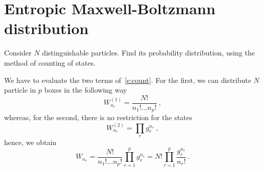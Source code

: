\section{Entropic Maxwell-Boltzmann distribution}

    \begin{exercise}
        Consider $N$ distinguishable particles. Find its probability distribution, using the method of counting of states.
    \end{exercise}

    We have to evaluate the two terms of~\eqref{e:count}. For the first, we can distribute $N$ particle in $p$ boxes in the following way 
    \begin{equation*}
        W^{(1)}_{n_r} = \frac{N!}{n_1! \ldots n_p!} ~,
    \end{equation*}
    whereas, for the second, there is no restriction for the states 
    \begin{equation*}
        W^{(2)}_{n_r} = \prod_r g_r^{n_r} ~,
    \end{equation*}
    hence, we obtain
    \begin{equation*}
        W_{n_r} = \frac{N!}{n_1! \ldots n_p!} \prod_{r=1}^p g_r^{n_r} = N! \prod_{r=1}^p \frac{g_r^{n_r}}{n_r!} ~.
    \end{equation*}

